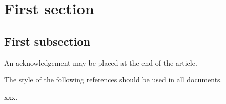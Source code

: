 \documentclass[cpp,fleqn]{w-art}
\begin{document}




\section{First section}
\subsection{First subsection}




\begin{acknowledgement}
  An acknowledgement may be placed at the end of the article.
\end{acknowledgement}

The style of the following references should be used in all documents.

\begin{thebibliography}{10}
 xxx.
\end{thebibliography}
\end{document}
